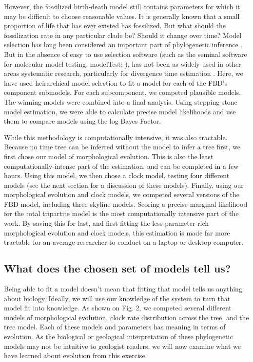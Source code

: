 \documentclass{article}
\begin{document}
However, the fossilized birth-death model still contains parameters for which it may be difficult to choose reasonable values.
It is generally known that a small proportion of life that has ever existed has fossilized. 
But what should the fossilization rate in any particular clade be?
Should it change over time? 
Model selection has long been considered an important part of phylogenetic inference \citep{Zwickl2004, allman08b, Baele2013a}.
But in the absence of easy to use selection software (such as the seminal software for molecular model testing, modelTest; \cite{posada1998}), has not been as widely used in other areas systematic research, particularly for divergence time estimation \citep{Duchene2015}.
Here, we have used heirarchical model selection to fit a model for each of the FBD's component submodels.
For each subcomponent, we competed plausible models.
The winning models were combined into a final analysis.
Using stepping-stone model estimation, we were able to calculate precise model likelihoods and use them to compare models using the log Bayes Factor.

While this methodology is computationally intensive, it was also tractable. 
Because no time tree can be inferred without the model to infer a tree first, we first chose our model of morphological evolution.
This is also the least computationally-intense part of the estimation, and can be completed in a few hours.
Using this model, we then chose a clock model, testing four different models (see the next section for a discussion of these models).
Finally, using our morphological evolution and clock models, we competed several versions of the FBD model, including three skyline models.
Scoring a precise marginal likelihood for the total tripartite model is the most computationally intensive part of the work. 
By saving this for last, and first fitting the less parameter-rich morphological evolution and clock models, this estimation is made far more tractable for an average researcher to conduct on a laptop or desktop computer. 

\subsection{What does the chosen set of models tell us?}

Being able to fit a model doesn't mean that fitting that model tells us anything about biology. 
Ideally, we will use our knowledge of the system to turn that model fit into knowledge. 
As shown on Fig. 2, we competed several different models of morphological evolution, clock rate distribution across the tree, and the tree model. 
Each of these models and parameters has meaning in terms of evolution. 
As the biological or geological interpretation of these phylogenetic models may not be intuitive to geologist readers, we will now examine what we have learned about evolution from this exercise.
\end{document}
